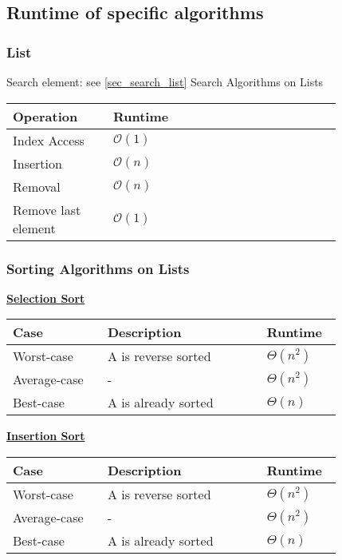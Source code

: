 \subsection{Runtime of specific algorithms}
    \subsubsection{List}
        Search element: see \ref{sec_search_list} Search Algorithms on Lists
        \begin{tabular*}{\linewidth}{| p{0.25\linewidth} | p{0.42\linewidth} | p{0.15\linewidth} |}
            \hline
            Operation & Runtime\\
            \hline \hline
            Index Access &  $\mathcal{O}(1)$ \\
            \hline
            Insertion & $\mathcal{O}(n)$ \\
            \hline
            Removal & $\mathcal{O}(n)$ \\
            \hline
            Remove last element & $\mathcal{O}(1)$\\
            \hline
        \end{tabular*}

    \subsubsection{Sorting Algorithms on Lists}
        {\centering\underline{\textbf{Selection Sort}} \par}
        \begin{tabular*}{\linewidth}{| p{0.25\linewidth} | p{0.42\linewidth} | p{0.15\linewidth} |}
            \hline
            Case & Description & Runtime\\
            \hline \hline
            Worst-case & A is reverse sorted & $\Theta(n^2)$ \\
            \hline
            Average-case & - & $\Theta(n^2)$ \\
            \hline
            Best-case & A is already sorted & $\Theta(n)$ \\
            \hline
        \end{tabular*}

        {\centering\underline{\textbf{Insertion Sort}} \par}
        \begin{tabular*}{\linewidth}{| p{0.25\linewidth} | p{0.42\linewidth} | p{0.15\linewidth} |}
            \hline
            Case & Description & Runtime\\
            \hline \hline
            Worst-case & A is reverse sorted & $\Theta(n^2)$ \\
            \hline
            Average-case & - & $\Theta(n^2)$ \\
            \hline
            Best-case & A is already sorted & $\Theta(n)$ \\
            \hline
        \end{tabular*}

